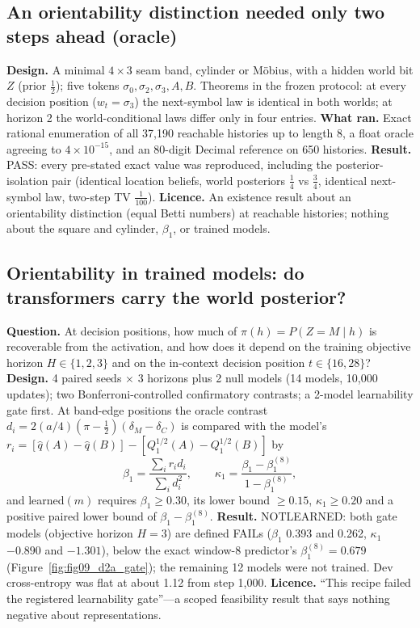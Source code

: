 \documentclass[11pt,a4paper]{article}
\DeclareRobustCommand{\_}{\ifmmode\origunderscore\else\textunderscore\allowbreak\fi}
\begin{document}
\subsection{An orientability distinction needed only two steps ahead (oracle)}
\textbf{Design.} A minimal $4\times3$ seam band, cylinder or M\"obius, with a hidden world bit $Z$
(prior $\tfrac12$); five tokens $\sigma_0,\sigma_2,\sigma_3,A,B$. Theorems in the frozen protocol:
at every decision position ($w_t=\sigma_3$) the next-symbol law is identical in both worlds; at
horizon 2 the world-conditional laws differ only in four entries. \textbf{What ran.} Exact rational
enumeration of all 37,190 reachable histories up to length 8, a float oracle agreeing to
$4\times10^{-15}$, and an 80-digit Decimal reference on 650 histories. \textbf{Result.} PASS: every
pre-stated exact value was reproduced, including the posterior-isolation pair (identical location
beliefs, world posteriors $\tfrac14$ vs $\tfrac34$, identical next-symbol law, two-step TV
$\tfrac1{100}$). \textbf{Licence.} An existence result about an
orientability distinction (equal Betti numbers) at reachable histories; nothing about the square
and cylinder, $\beta_1$, or trained models.

\subsection{Orientability in trained models: do transformers carry the world posterior?}
\textbf{Question.} At decision positions, how much of $\pi(h)=P(Z=M\mid h)$ is recoverable from the
activation, and how does it depend on the training objective horizon $H\in\{1,2,3\}$ and on the
in-context decision position $t\in\{16,28\}$? \textbf{Design.} 4 paired seeds $\times$ 3 horizons
plus 2 null models (14 models, 10,000 updates); two Bonferroni-controlled confirmatory contrasts;
a 2-model learnability gate first. At band-edge positions the oracle contrast
$d_i=2(a/4)(\pi-\tfrac12)(\delta_M-\delta_C)$ is compared with the model's
$r_i=[\hat q(A)-\hat q(B)]-[Q_1^{1/2}(A)-Q_1^{1/2}(B)]$ by
\begin{equation}
\beta_1=\frac{\sum_ir_id_i}{\sum_id_i^2},\qquad
\kappa_1=\frac{\beta_1-\beta_1^{(8)}}{1-\beta_1^{(8)}},
\end{equation}
and learned$(m)$ requires $\beta_1\ge0.30$, its lower bound $\ge0.15$, $\kappa_1\ge0.20$ and a
positive paired lower bound of $\beta_1-\beta_1^{(8)}$.
\textbf{Result.} NOT\_LEARNED: both gate models (objective horizon $H=3$) are defined FAILs
($\beta_1$ 0.393 and 0.262, $\kappa_1$ $-0.890$ and $-1.301$), below the exact window-8 predictor's
$\beta_1^{(8)}=0.679$ (Figure~\ref{fig:fig09_d2a_gate}); the remaining 12 models were not
trained. Dev cross-entropy was flat at about 1.12 from step 1,000.
\textbf{Licence.} ``This recipe failed the registered learnability gate''---a scoped feasibility
result that says nothing negative about representations.
\end{document}

